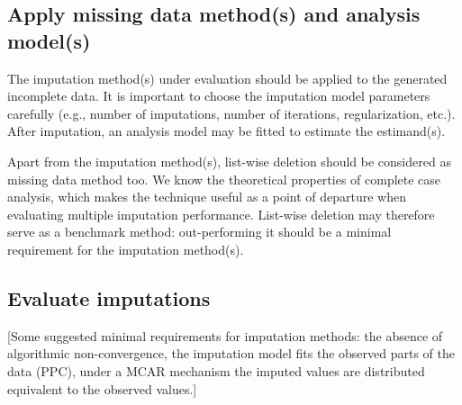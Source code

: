 \documentclass[bimj,fleqn]{w-art}
\begin{document}

\subsection{Apply missing data method(s) and analysis model(s)}


The imputation method(s) under evaluation should be applied to the generated incomplete data. It is important to choose the imputation model parameters carefully (e.g., number of imputations, number of iterations, regularization, etc.). After imputation, an analysis model may be fitted to estimate the estimand(s).


Apart from the imputation method(s), list-wise deletion should be considered as missing data method too. We know the theoretical properties of complete case analysis, which makes the technique useful as a point of departure when evaluating multiple imputation performance. List-wise deletion may therefore serve as a benchmark method: out-performing it should be a minimal requirement for the imputation method(s). %


\subsection{Evaluate imputations}


[Some suggested minimal requirements for imputation methods: the absence of algorithmic non-convergence, the imputation model fits the observed parts of the data (PPC), under a MCAR mechanism the imputed values are distributed equivalent to the observed values.]
\end{document}
